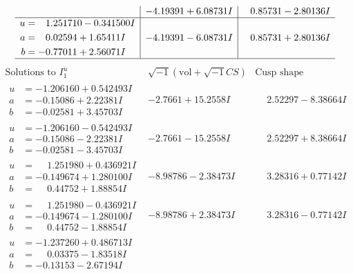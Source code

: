 \documentclass[1p]{elsarticle_modified}
\theoremstyle{definition}
\newcommand{\I}{\sqrt{-1}}
\begin{document}
$$\begin{array}{c|c|c}
 & -4.19391 + 6.08731 I & \phantom{-}0.85731 - 2.80136 I \\ \hline\begin{aligned}
u &= \phantom{-}1.251710 - 0.341500 I \\
a &= \phantom{-}0.02594 + 1.65411 I \\
b &= -0.77011 + 2.56071 I\end{aligned}
 & -4.19391 - 6.08731 I & \phantom{-}0.85731 + 2.80136 I\\
 \hline 
 \end{array}$$\newpage$$\begin{array}{c|c|c}  
\text{Solutions to }I^u_{1}& \I (\text{vol} + \sqrt{-1}CS) & \text{Cusp shape}\\
 \hline 
\begin{aligned}
u &= -1.206160 + 0.542493 I \\
a &= -0.15086 + 2.22381 I \\
b &= -0.02581 + 3.45703 I\end{aligned}
 & -2.7661 + 15.2558 I & \phantom{-}2.52297 - 8.38664 I \\ \hline\begin{aligned}
u &= -1.206160 - 0.542493 I \\
a &= -0.15086 - 2.22381 I \\
b &= -0.02581 - 3.45703 I\end{aligned}
 & -2.7661 - 15.2558 I & \phantom{-}2.52297 + 8.38664 I \\ \hline\begin{aligned}
u &= \phantom{-}1.251980 + 0.436921 I \\
a &= -0.149674 + 1.280100 I \\
b &= \phantom{-}0.44752 + 1.88854 I\end{aligned}
 & -8.98786 - 2.38473 I & \phantom{-}3.28316 + 0.77142 I \\ \hline\begin{aligned}
u &= \phantom{-}1.251980 - 0.436921 I \\
a &= -0.149674 - 1.280100 I \\
b &= \phantom{-}0.44752 - 1.88854 I\end{aligned}
 & -8.98786 + 2.38473 I & \phantom{-}3.28316 - 0.77142 I \\ \hline\begin{aligned}
u &= -1.237260 + 0.486713 I \\
a &= \phantom{-}0.03375 - 1.83518 I \\
b &= -0.13153 - 2.67194 I\end{aligned}

\end{array}$$
\end{document}
